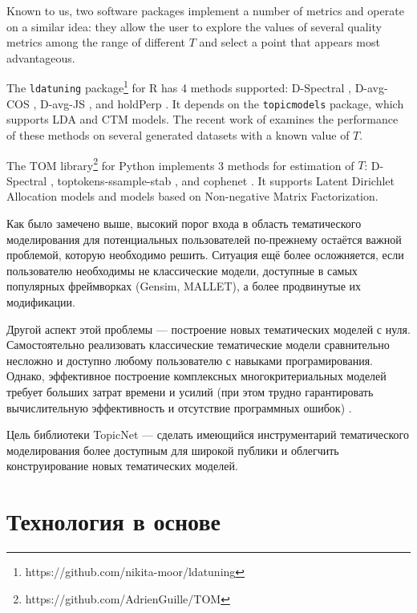 Known to us, two software packages implement a number of metrics and operate on a similar idea:  they allow the user to explore the values of several quality metrics among the range of different $T$ and select a point that appears most advantageous.

The \texttt{ldatuning} package\footnote{https://github.com/nikita-moor/ldatuning} for R \cite{ldatuning} has 4 methods supported:  D-Spectral \cite{arun2010finding}, D-avg-COS \cite{cao2009density}, D-avg-JS \cite{deveaud2014accurate}, and holdPerp \cite{griffiths2004finding}. It depends on the \texttt{topicmodels} package, which supports LDA and CTM models. The recent work of \cite{hou2018benchmarking} examines the performance of these methods on several generated datasets with a known value of $T$.

The TOM library\footnote{https://github.com/AdrienGuille/TOM} for Python \cite{guille2016tom} implements 3 methods for estimation of $T$: D-Spectral \cite{arun2010finding}, toptokens-ssample-stab \cite{greene14howmany}, and cophenet \cite{Brunet4164}.  It supports Latent Dirichlet Allocation models and models based on Non-negative Matrix Fac\-tor\-iza\-tion.

Как было замечено выше, высокий порог входа в область тематического моделирования для потенциальных пользователей по-прежнему остаётся важной проблемой, которую необходимо решить. Ситуация ещё более осложняется, если пользователю необходимы не классические модели, доступные в самых популярных фреймворках (Gensim, MALLET), а более продвинутые их модификации.

Другой аспект этой проблемы --- построение новых тематических моделей с нуля. Самостоятельно реализовать классические тематические модели сравнительно несложно и доступно любому пользователю с навыками програмирования. Однако, эффективное построение комплексных многокритериальных моделей требует больших затрат времени и усилий (при этом трудно гарантировать вычислительную эффективность и отсутствие программных ошибок) \cite{jiang2018familia}.

Цель библиотеки TopicNet --- сделать имеющийся инструментарий тематического моделирования более доступным для широкой публики и облегчить конструирование новых тематических моделей.


\section{Технология в основе}

